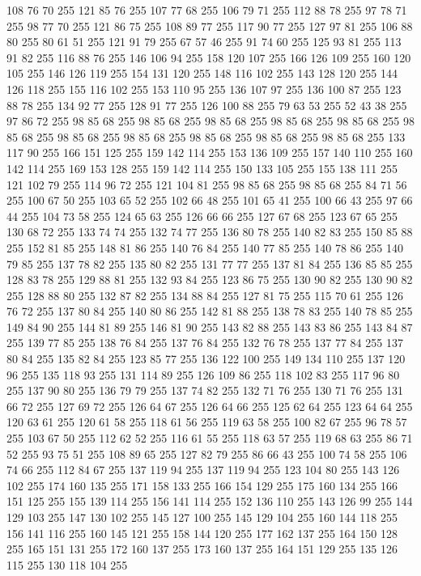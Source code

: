 108 76 70 255 121 85 76 255 107 77 68 255 106 79 71 255 112 88 78 255 97 78 71 255 98 77 70 255 121 86 75 255 108 89 77 255 117 90 77 255 127 97 81 255 106 88 80 255 80 61 51 255 121 91 79 255 67 57 46 255 91 74 60 255 125 93 81 255 113 91 82 255 116 88 76 255 146 106 94 255 158 120 107 255 166 126 109 255 160 120 105 255 146 126 119 255 154 131 120 255 148 116 102 255 143 128 120 255 144 126 118 255 155 116 102 255 153 110 95 255 136 107 97 255 136 100 87 255 123 88 78 255 134 92 77 255 128 91 77 255 126 100 88 255 79 63 53 255 52 43 38 255 97 86 72 255 98 85 68 255 98 85 68 255 98 85 68 255 98 85 68 255 98 85 68 255 98 85 68 255 98 85 68 255 98 85 68 255 98 85 68 255 98 85 68 255 98 85 68 255 133 117 90 255 166 151 125 255 159 142 114 255 153 136 109 255 157 140 110 255 160 142 114 255 169 153 128 255 159 142 114 255 150 133 105 255 155 138 111 255 121 102 79 255 114 96 72 255 121 104 81 255 98 85 68 255
98 85 68 255 84 71 56 255 100 67 50 255 103 65 52 255 102 66 48 255 101 65 41 255 100 66 43 255 97 66 44 255 104 73 58 255 124 65 63 255 126 66 66 255 127 67 68 255 123 67 65 255 130 68 72 255 133 74 74 255 132 74 77 255 136 80 78 255 140 82 83 255 150 85 88 255 152 81 85 255 148 81 86 255 140 76 84 255 140 77 85 255 140 78 86 255 140 79 85 255 137 78 82 255 135 80 82 255 131 77 77 255 137 81 84 255 136 85 85 255 128 83 78 255 129 88 81 255 132 93 84 255 123 86 75 255 130 90 82 255 130 90 82 255 128 88 80 255 132 87 82 255 134 88 84 255 127 81 75 255 115 70 61 255 126 76 72 255 137 80 84 255 140 80 86 255 142 81 88 255 138 78 83 255 140 78 85 255 149 84 90 255 144 81 89 255 146 81 90 255 143 82 88 255 143 83 86 255 143 84 87 255 139 77 85 255 138 76 84 255 137 76 84 255 132 76 78 255 137 77 84 255 137 80 84 255 135 82 84 255 123 85 77 255 136 122 100 255 149 134 110 255 137 120 96 255
135 118 93 255 131 114 89 255 126 109 86 255 118 102 83 255 117 96 80 255 137 90 80 255 136 79 79 255 137 74 82 255 132 71 76 255 130 71 76 255 131 66 72 255 127 69 72 255 126 64 67 255 126 64 66 255 125 62 64 255 123 64 64 255 120 63 61 255 120 61 58 255 118 61 56 255 119 63 58 255 100 82 67 255 96 78 57 255 103 67 50 255 112 62 52 255 116 61 55 255 118 63 57 255 119 68 63 255 86 71 52 255 93 75 51 255 108 89 65 255 127 82 79 255 86 66 43 255 100 74 58 255 106 74 66 255 112 84 67 255 137 119 94 255 137 119 94 255 123 104 80 255 143 126 102 255 174 160 135 255 171 158 133 255 166 154 129 255 175 160 134 255 166 151 125 255 155 139 114 255 156 141 114 255 152 136 110 255 143 126 99 255 144 129 103 255 147 130 102 255 145 127 100 255 145 129 104 255 160 144 118 255 156 141 116 255 160 145 121 255 158 144 120 255 177 162 137 255 164 150 128 255 165 151 131 255 172 160 137 255 173 160 137 255 164 151 129 255 135 126 115 255 130 118 104 255
